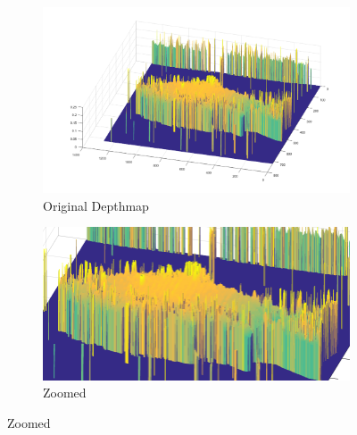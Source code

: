 \begin{figure}[H]
    \begin{subfigure}{0.41\textwidth}
        \includegraphics[width=\linewidth]{images/results/3D_plots/original_3D_87}
        \caption{Original Depthmap}
    \end{subfigure}\hspace*{\fill}
    \begin{subfigure}{0.57\textwidth}
        \includegraphics[width=\linewidth]{images/results/3D_plots/zoomed_original_3D_87}
        \caption{Zoomed}
    \end{subfigure}
    

\end{figure}
